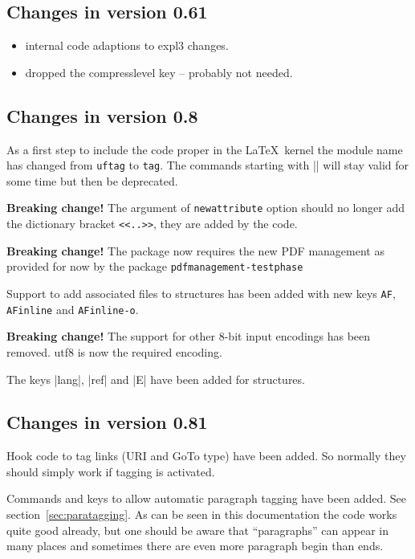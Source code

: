 \documentclass[DIV=12,parskip=half-,bibliography=totoc]{scrartcl}
\begin{document}
\subsection{Changes in version 0.61}



\begin{itemize}
\item internal code adaptions to expl3 changes.
\item dropped the compresslevel key  -- probably not needed.
\end{itemize}




\subsection{Changes in version 0.8}



As a first step to include the code proper in the \LaTeX\ kernel the module name has changed from \texttt{uftag} to \texttt{tag}. The commands starting with |\uftag| will stay valid for some time but then be deprecated.

\textbf{Breaking change!} The argument of \texttt{newattribute} option should no longer add the dictionary bracket \verb+<<..>>+, they are added by the code.


\textbf{Breaking change!} The package now requires the new PDF management as provided for now by the package \texttt{pdfmanagement-testphase}

Support to add associated files to structures has been added with new keys \texttt{AF}, \texttt{AFinline} and \texttt{AFinline-o}.

\textbf{Breaking change!} The support for other 8-bit input encodings has been removed.
utf8 is now the required encoding.

The keys |lang|, |ref| and |E| have been added for structures.

\subsection{Changes in version 0.81}

Hook code to tag links (URI and GoTo type) have been added. So normally they should simply work if tagging
is activated.

Commands and keys to allow automatic paragraph tagging have been added. See section~\ref{sec:paratagging}.
As can be seen in this documentation the code works quite good already, but one should be aware that \enquote{paragraphs} can appear in many places and sometimes there are even more paragraph begin than ends.
\end{document}
